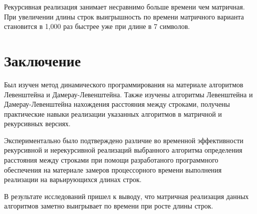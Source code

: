 ﻿\documentclass[12pt]{report}
\begin{document}
\par
Рекурсивная реализация занимает несравнимо больше времени чем матричная. При увеличении длины строк выигрышность по времени матричного варианта становится в 1,000 раз быстрее уже при длине в 7 символов.

\chapter*{Заключение}
Был изучен метод динамического программирования на материале алгоритмов Левенштейна и Дамерау-Левенштейна.
Также изучены алгоритмы Левенштейна и Дамерау-Левенштейна нахождения расстояния между строками, получены практические навыки реализации указанных алгоритмов
в матричной и рекурсивных версиях. 

Экспериментально было подтверждено различие во временной эффективности рекурсивной и нерекурсивной реализаций выбранного алгоритма определения расстояния между строками при помощи разработаного программного обеспечения на материале замеров процессорного времени выполнения реализации на варьирующихся длинах строк. 

В результате исследований пришел к выводу, что матричная реализация данных алгоритмов заметно выигрывает по времени при росте длины строк.
\end{document}
